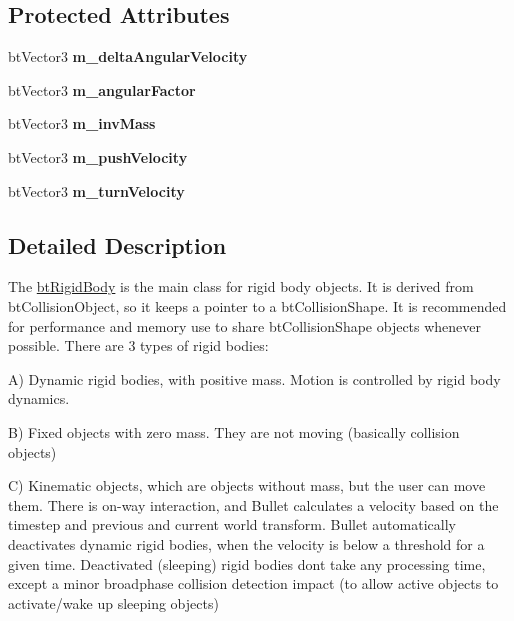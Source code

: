 \subsection*{Protected Attributes}
\begin{DoxyCompactItemize}
\item 
\mbox{\label{classbtRigidBody_a9572a43e28f91ababaa1e7f717ed8975}} 
bt\+Vector3 {\bfseries m\+\_\+delta\+Angular\+Velocity}
\item 
\mbox{\label{classbtRigidBody_a8010986d82f1d721f5a50b2019cb5a80}} 
bt\+Vector3 {\bfseries m\+\_\+angular\+Factor}
\item 
\mbox{\label{classbtRigidBody_afbfac64b1739b84137ca1787e9ce8505}} 
bt\+Vector3 {\bfseries m\+\_\+inv\+Mass}
\item 
\mbox{\label{classbtRigidBody_a9b6d67f30ca4df6b7668ddd40797e42f}} 
bt\+Vector3 {\bfseries m\+\_\+push\+Velocity}
\item 
\mbox{\label{classbtRigidBody_a518a768b3357fe5da25202c1ddc5b335}} 
bt\+Vector3 {\bfseries m\+\_\+turn\+Velocity}
\end{DoxyCompactItemize}


\subsection{Detailed Description}
The \hyperlink{classbtRigidBody}{bt\+Rigid\+Body} is the main class for rigid body objects. It is derived from bt\+Collision\+Object, so it keeps a pointer to a bt\+Collision\+Shape. It is recommended for performance and memory use to share bt\+Collision\+Shape objects whenever possible. There are 3 types of rigid bodies\+:
\begin{DoxyItemize}
\item A) Dynamic rigid bodies, with positive mass. Motion is controlled by rigid body dynamics.
\item B) Fixed objects with zero mass. They are not moving (basically collision objects)
\item C) Kinematic objects, which are objects without mass, but the user can move them. There is on-\/way interaction, and Bullet calculates a velocity based on the timestep and previous and current world transform. Bullet automatically deactivates dynamic rigid bodies, when the velocity is below a threshold for a given time. Deactivated (sleeping) rigid bodies don\textquotesingle{}t take any processing time, except a minor broadphase collision detection impact (to allow active objects to activate/wake up sleeping objects) 
\end{DoxyItemize}

